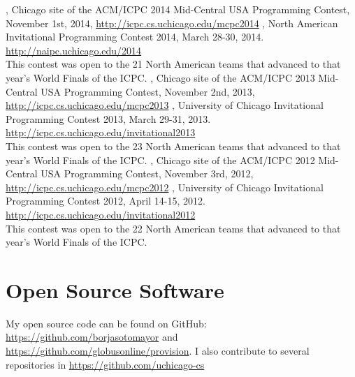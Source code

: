 \documentclass{resume}
\begin{document}
\begin{category}{}
, Chicago site of the ACM/ICPC 2014 Mid-Central USA Programming Contest, November 1st, 2014, \url{http://icpc.cs.uchicago.edu/mcpc2014}
, North American Invitational Programming Contest 2014, March 28-30, 2014. \url{http://naipc.uchicago.edu/2014}\\
This contest was open to the 21 North American teams that advanced to that year's World Finals of the ICPC.
, Chicago site of the ACM/ICPC 2013 Mid-Central USA Programming Contest, November 2nd, 2013, \url{http://icpc.cs.uchicago.edu/mcpc2013}
, University of Chicago Invitational Programming Contest 2013, March 29-31, 2013. \url{http://icpc.cs.uchicago.edu/invitational2013}\\
This contest was open to the 23 North American teams that advanced to that year's World Finals of the ICPC. 
, Chicago site of the ACM/ICPC 2012 Mid-Central USA Programming Contest, November 3rd, 2012, \url{http://icpc.cs.uchicago.edu/mcpc2012}
, University of Chicago Invitational Programming Contest 2012, April 14-15, 2012. \url{http://icpc.cs.uchicago.edu/invitational2012}\\
This contest was open to the 22 North American teams that advanced to that year's World Finals of the ICPC. 
\end{category}


\section*{\hspace{-1cm}Open Source Software}

My open source code can be found on GitHub: \url{https://github.com/borjasotomayor} and \url{https://github.com/globusonline/provision}. I also contribute to several repositories in \url{https://github.com/uchicago-cs}
\end{document}
